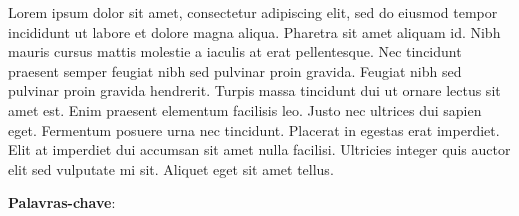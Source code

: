 
\begin{resumo}[ABSTRACT]
\begin{SingleSpacing}
Lorem ipsum dolor sit amet, consectetur adipiscing elit, sed do eiusmod tempor incididunt ut labore et dolore magna aliqua. Pharetra sit amet aliquam id. Nibh mauris cursus mattis molestie a iaculis at erat pellentesque. Nec tincidunt praesent semper feugiat nibh sed pulvinar proin gravida. Feugiat nibh sed pulvinar proin gravida hendrerit. Turpis massa tincidunt dui ut ornare lectus sit amet est. Enim praesent elementum facilisis leo. Justo nec ultrices dui sapien eget. Fermentum posuere urna nec tincidunt. Placerat in egestas erat imperdiet. Elit at imperdiet dui accumsan sit amet nulla facilisi. Ultricies integer quis auctor elit sed vulputate mi sit. Aliquet eget sit amet tellus.
\end{SingleSpacing}

\begin{SingleSpacing}
\textbf{Palavras-chave}: 
\end{SingleSpacing}
\end{resumo}

